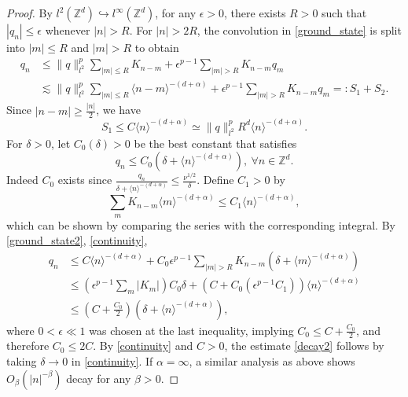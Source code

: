 \documentclass{article}
\numberwithin{equation}{section}
\begin{document}
\begin{proof}
By $l^2(\mathbb{Z}^d) \hookrightarrow l^\infty(\mathbb{Z}^d)$, for any $\epsilon > 0$, there exists $R>0$ such that $|q_n| \leq \epsilon$ whenever $|n| > R$. For $|n| > 2R$, the convolution in \eqref{ground_state} is split into $|m| \leq R$ and $|m| > R$ to obtain
\begin{equation}\label{ground_state2}
\begin{split}
    q_n &\leq \| q \|_{l^2}^p \sum_{|m| \leq R} K_{n-m} + \epsilon^{p-1}\sum_{|m| > R} K_{n-m} q_m\\
    &\lesssim \| q \|_{l^2}^p\sum_{|m| \leq R} \langle n-m \rangle^{-(d+\alpha)}+ \epsilon^{p-1}\sum_{|m| > R} K_{n-m} q_m =: S_1 + S_2.
\end{split}
\end{equation}
Since $|n-m| \geq \frac{|n|}{2}$, we have
\begin{equation*}
S_1 \leq C  \langle n \rangle^{-(d+\alpha)} \simeq \| q \|_{l^2}^p R^d \langle n \rangle^{-(d+\alpha)}.   
\end{equation*}
For $\delta > 0$, let $C_0(\delta) > 0$ be the best constant that satisfies
\begin{equation}\label{continuity}
    q_n \leq C_0(\delta + \langle n \rangle^{-(d+\alpha)}),\ \forall n \in \mathbb{Z}^d.
\end{equation}
Indeed $C_0$ exists since $\frac{q_n}{\delta + \langle n \rangle^{-(d+\alpha)}} \leq \frac{\nu^{1/2}}{\delta}$. Define $C_1 > 0$ by
\begin{equation*}
\sum\limits_{m} K_{n-m} \langle m \rangle^{-(d+\alpha)} \leq C_1 \langle n \rangle^{-(d+\alpha)},    
\end{equation*}
which can be shown by comparing the series with the corresponding integral. By \eqref{ground_state2}, \eqref{continuity},
\begin{equation*}
\begin{split}
    q_n &\leq C \langle n \rangle^{-(d+\alpha)} + C_0 \epsilon^{p-1} \sum_{|m| > R} K_{n-m} (\delta + \langle m \rangle^{-(d+\alpha)})\\
    &\leq (\epsilon^{p-1}\sum_{m} |K_{m}|) C_0\delta +  (C + C_0 (\epsilon^{p-1}C_1))\langle n \rangle^{-(d+\alpha)}\\
    &\leq (C + \frac{C_0}{2})(\delta + \langle n \rangle^{-(d+\alpha)}),
\end{split}
\end{equation*}
where $0 < \epsilon \ll 1$ was chosen at the last inequality, implying $C_0 \leq C + \frac{C_0}{2}$, and therefore $C_0 \leq 2C$. By \eqref{continuity} and $C>0$, the estimate \eqref{decay2} follows by taking $\delta \rightarrow 0$ in \eqref{continuity}. If $\alpha = \infty$, a similar analysis as above shows $O_{\beta}(|n|^{-\beta})$ decay for any $\beta > 0$.


\end{proof}
\end{document}
